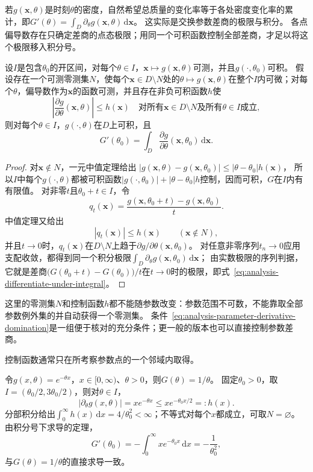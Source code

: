 若$g(\bm x,\theta)$是时刻$\theta$的密度，自然希望总质量的变化率等于各处密度变化率的累计，即$G'(\theta)=\int_D\partial_\theta g(\bm x,\theta)\,\mathrm d\bm x$。
这实际是交换参数差商的极限与积分。
各点偏导数存在只确定差商的点态极限；用同一个可积函数控制全部差商，才足以将这个极限移入积分号。
\begin{theorem}[可积导数界下的积分号内求导]
设$I$是包含$\theta_0$的开区间，对每个$\theta\in I$，$\bm x\mapsto g(\bm x,\theta)$可测，并且$g(\cdot,\theta_0)$可积。
假设存在一个可测零测集$N$，使每个$\bm x\in D\setminus N$处的$\theta\mapsto g(\bm x,\theta)$在整个$I$内可微；对每个$\theta$，偏导数作为$\bm x$的函数可测，并且存在非负可积函数$h$使
\begin{equation}
 \left|\frac{\partial g}{\partial\theta}(\bm x,\theta)\right|\leq h(\bm x)
 \quad\text{对所有$\bm x\in D\setminus N$及所有$\theta\in I$成立},
 \label{eq:analysis-parameter-derivative-domination}
\end{equation}
则对每个$\theta\in I$，$g(\cdot,\theta)$在$D$上可积，且
\begin{equation}
 G'(\theta_0)=\int_D\frac{\partial g}{\partial\theta}(\bm x,\theta_0)\,\mathrm d\bm x.
 \label{eq:analysis-differentiate-under-integral}
\end{equation}
\end{theorem}
\begin{proof}
对$\bm x\notin N$，一元中值定理给出
$|g(\bm x,\theta)-g(\bm x,\theta_0)|\leq|\theta-\theta_0|h(\bm x)$，
所以$I$中每个$g(\cdot,\theta)$都被可积函数$|g(\cdot,\theta_0)|+|\theta-\theta_0|h$控制，因而可积，$G$在$I$内有有限值。
对非零$t$且$\theta_0+t\in I$，令
\[
 q_t(\bm x)=\frac{g(\bm x,\theta_0+t)-g(\bm x,\theta_0)}{t}.
\]
中值定理又给出
\[
 |q_t(\bm x)|\leq h(\bm x)\qquad(\bm x\notin N),
\]
并且$t\to0$时，$q_t(\bm x)$在$D\setminus N$上趋于$\partial g/\partial\theta(\bm x,\theta_0)$。
对任意非零序列$t_n\to0$应用支配收敛，都得到同一个积分极限$\int_D\partial_\theta g(\bm x,\theta_0)\,\mathrm d\bm x$；
由实数极限的序列判据，它就是差商$\bigl(G(\theta_0+t)-G(\theta_0)\bigr)/t$在$t\to0$时的极限，即式~\eqref{eq:analysis-differentiate-under-integral}。
\end{proof}

这里的零测集$N$和控制函数$h$都不能随参数改变：参数范围不可数，不能靠取全部参数例外集的并自动获得一个零测集。
条件~\eqref{eq:analysis-parameter-derivative-domination}是一组便于核对的充分条件；更一般的版本也可以直接控制参数差商。

控制函数通常只在所考察参数点的一个邻域内取得。
\begin{example}
\label{ex:region-differentiate-exponential}
令$g(x,\theta)=e^{-\theta x}$，$x\in[0,\infty)$、$\theta>0$，则$G(\theta)=1/\theta$。
固定$\theta_0>0$，取$I=(\theta_0/2,3\theta_0/2)$，则对$\theta\in I$，
\[
 |\partial_\theta g(x,\theta)|=xe^{-\theta x}\leq xe^{-\theta_0x/2}=:h(x).
\]
分部积分给出$\int_0^\infty h(x)\,\mathrm dx=4/\theta_0^2<\infty$；不等式对每个$x$都成立，可取$N=\varnothing$。
由积分号下求导的定理，
\[
 G'(\theta_0)=-\int_0^\infty xe^{-\theta_0x}\,\mathrm dx=-\frac{1}{\theta_0^2},
\]
与$G(\theta)=1/\theta$的直接求导一致。
\end{example}

